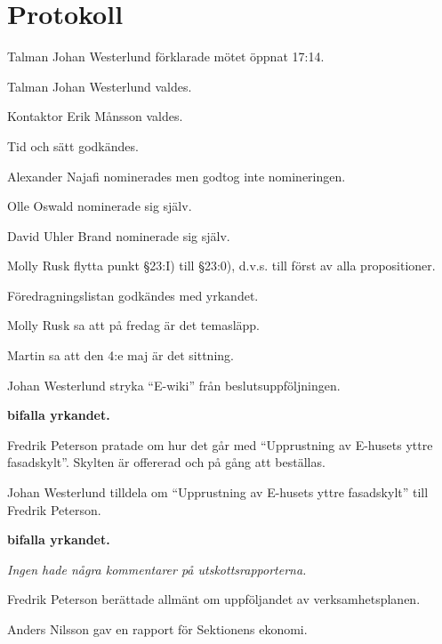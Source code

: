 \documentclass[10pt]{article}
\def\mo{Johan Westerlund}
\def\ms{Erik Månsson}
\begin{document}
\newpage

\section*{Protokoll}
\begin{paragrafer}
Talman {\mo} förklarade mötet öppnat 17:14.

Talman {\mo} valdes.

Kontaktor {\ms} valdes.

Tid och sätt godkändes.

Alexander Najafi nominerades men godtog inte nomineringen.

Olle Oswald nominerade sig själv.

David Uhler Brand nominerade sig själv.

\valavj

\ingaadj

Molly Rusk \ypa flytta punkt \S23:I) till \S23:0), d.v.s. till först av alla propositioner.

Föredragningslistan godkändes med yrkandet.


Molly Rusk sa att på fredag är det temasläpp.

Martin sa att den 4:e maj är det sittning.


Johan Westerlund \ypa stryka ``E-wiki'' från beslutsuppföljningen.

\textbf{\Mba bifalla yrkandet.}

Fredrik Peterson pratade om hur det går med ``Upprustning av E-husets yttre fasadskylt''. Skylten är offererad och på gång att beställas.

Johan Westerlund \ypa tilldela om ``Upprustning av E-husets yttre fasadskylt'' till Fredrik Peterson. %

\textbf{\Mba bifalla yrkandet.}

\emph{Ingen hade några kommentarer på utskottsrapporterna.}

Fredrik Peterson berättade allmänt om uppföljandet av verksamhetsplanen.

Anders Nilsson gav en rapport för Sektionens ekonomi.


\end{paragrafer}
\end{document}
